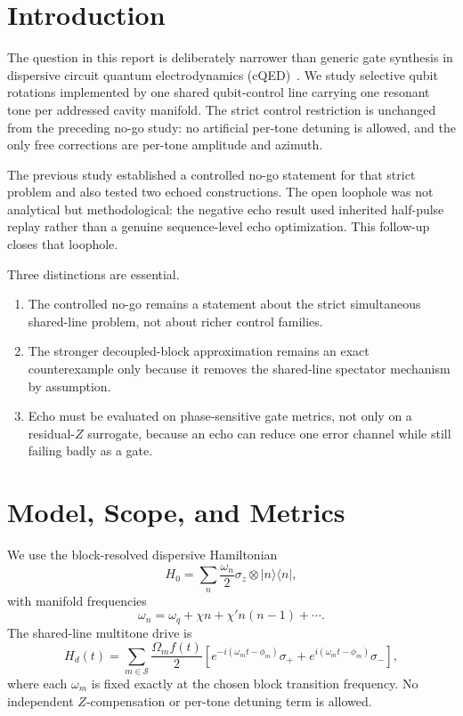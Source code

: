 \documentclass[aps,pra,twocolumn,reprint,floatfix,amsmath,amssymb]{revtex4-2}
\begin{document}
\maketitle

\section{Introduction}

The question in this report is deliberately narrower than generic gate synthesis in dispersive circuit quantum electrodynamics (cQED)~\cite{blais2004cavity,blais2021circuit,koch2007transmon}. We study selective qubit rotations implemented by one shared qubit-control line carrying one resonant tone per addressed cavity manifold. The strict control restriction is unchanged from the preceding no-go study: no artificial per-tone detuning is allowed, and the only free corrections are per-tone amplitude and azimuth.

The previous study established a controlled no-go statement for that strict problem and also tested two echoed constructions. The open loophole was not analytical but methodological: the negative echo result used inherited half-pulse replay rather than a genuine sequence-level echo optimization. This follow-up closes that loophole.

Three distinctions are essential.
\begin{enumerate}
  \item The controlled no-go remains a statement about the strict simultaneous shared-line problem, not about richer control families.
  \item The stronger decoupled-block approximation remains an exact counterexample only because it removes the shared-line spectator mechanism by assumption.
  \item Echo must be evaluated on phase-sensitive gate metrics, not only on a residual-\(Z\) surrogate, because an echo can reduce one error channel while still failing badly as a gate.
\end{enumerate}

\section{Model, Scope, and Metrics}
\label{sec:model}

We use the block-resolved dispersive Hamiltonian
\begin{equation}
H_0 = \sum_n \frac{\omega_n}{2}\sigma_z \otimes |n\rangle\langle n|,
\end{equation}
with manifold frequencies
\begin{equation}
\omega_n = \omega_q + \chi n + \chi' n(n-1) + \cdots .
\end{equation}
The shared-line multitone drive is
\begin{equation}
H_d(t)=\sum_{m\in \mathcal S}\frac{\Omega_m f(t)}{2}
\left[e^{-i(\omega_m t-\phi_m)}\sigma_+ + e^{i(\omega_m t-\phi_m)}\sigma_- \right],
\end{equation}
where each \(\omega_m\) is fixed exactly at the chosen block transition frequency. No independent \(Z\)-compensation or per-tone detuning term is allowed.
\end{document}
